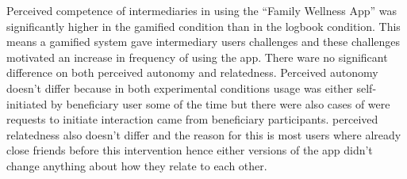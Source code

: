 \documentclass{sig-alternate}
\begin{document}
\newline
Perceived competence of intermediaries in using the ``Family Wellness App'' was significantly higher in the gamified condition than in the logbook condition. This means a gamified system gave intermediary users challenges and these challenges motivated an increase in frequency of using the app. There ware no significant difference on both perceived autonomy and relatedness. Perceived autonomy doesn't differ because in both experimental conditions usage was either self-initiated by beneficiary user some of the time but there were also cases of were requests to initiate interaction came from beneficiary participants. perceived relatedness also doesn't differ and the reason for this is most users where already close friends before this intervention hence either versions of the app didn't change anything about how they relate to each other.\newline  
\end{document}
